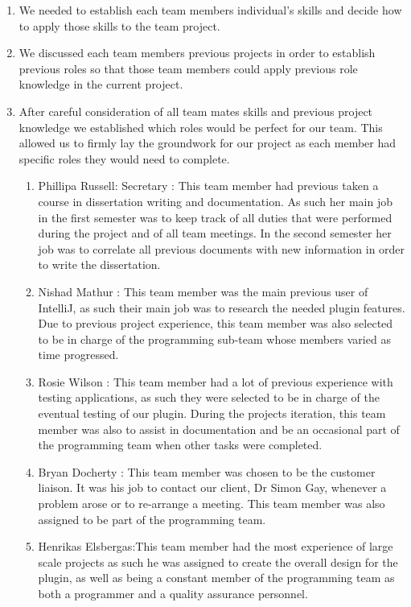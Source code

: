 \documentclass{l3proj}
\begin{document}
\begin {enumerate}
	\item We needed to establish each team members individual's skills and decide how to apply those skills to the team project.
	\item We discussed each team members previous projects in order to establish previous roles so that those team members could apply previous role knowledge in the current project. 
	\item After careful consideration of all team mates skills and previous project knowledge we established which roles would be perfect for our team. This allowed us to firmly lay the groundwork for our project as each member had specific roles they would need to complete.
	\begin{enumerate}
		\item Phillipa Russell: Secretary : This team member had previous taken a course in dissertation writing and documentation. As such her main job in the first semester was to keep track of all duties that were performed during the project and of all team meetings. In the second semester her job was to correlate all previous documents with new information in order to write the dissertation.
		\item Nishad Mathur : This team member was the main previous user of IntelliJ, as such their main job was to research the needed plugin features. Due to previous project experience, this team member was also selected to be in charge of the programming  sub-team whose members varied as time progressed. 
		\item Rosie Wilson : This team member had a lot of previous experience with testing applications, as such they were selected to be in charge of the eventual testing of our plugin. During the projects iteration, this team member was also to assist in documentation and be an occasional part of the programming team when other tasks were completed. 
		\item Bryan Docherty : This team member was chosen to be the customer liaison. It was his job to contact our client, Dr Simon Gay, whenever a problem arose or to re-arrange a meeting. This team member was also assigned to be part of the programming team.
		\item Henrikas Elsbergas:This team member had the most experience of large scale projects as such he was assigned to create the overall design for the plugin,  as well as being a constant member of the  programming team  as both a programmer and a quality assurance personnel.
	\end{enumerate}
\end{enumerate}
\end{document}
